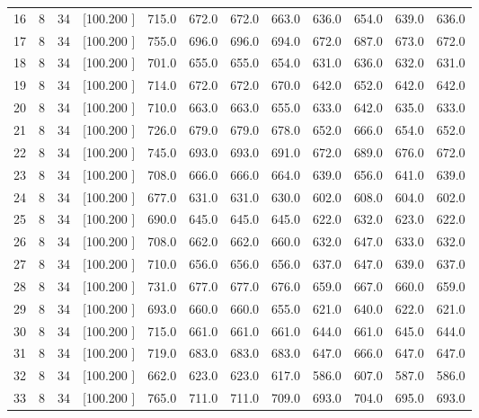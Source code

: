 \documentclass[12pt,a4paper]{article}
\begin{document}
\begin{center}
{\begin{tabular}{r r r r r r r r r r r r}
  16&  8& 34&[100.200   ]&   715.0&   672.0&   672.0&   663.0&   636.0&   654.0&   639.0&   636.0\\[-0.02in]
  17&  8& 34&[100.200   ]&   755.0&   696.0&   696.0&   694.0&   672.0&   687.0&   673.0&   672.0\\[-0.02in]
  18&  8& 34&[100.200   ]&   701.0&   655.0&   655.0&   654.0&   631.0&   636.0&   632.0&   631.0\\[-0.02in]
  19&  8& 34&[100.200   ]&   714.0&   672.0&   672.0&   670.0&   642.0&   652.0&   642.0&   642.0\\[-0.02in]
  20&  8& 34&[100.200   ]&   710.0&   663.0&   663.0&   655.0&   633.0&   642.0&   635.0&   633.0\\[-0.02in]
  21&  8& 34&[100.200   ]&   726.0&   679.0&   679.0&   678.0&   652.0&   666.0&   654.0&   652.0\\[-0.02in]
  22&  8& 34&[100.200   ]&   745.0&   693.0&   693.0&   691.0&   672.0&   689.0&   676.0&   672.0\\[-0.02in]
  23&  8& 34&[100.200   ]&   708.0&   666.0&   666.0&   664.0&   639.0&   656.0&   641.0&   639.0\\[-0.02in]
  24&  8& 34&[100.200   ]&   677.0&   631.0&   631.0&   630.0&   602.0&   608.0&   604.0&   602.0\\[-0.02in]
  25&  8& 34&[100.200   ]&   690.0&   645.0&   645.0&   645.0&   622.0&   632.0&   623.0&   622.0\\[-0.02in]
  26&  8& 34&[100.200   ]&   708.0&   662.0&   662.0&   660.0&   632.0&   647.0&   633.0&   632.0\\[-0.02in]
  27&  8& 34&[100.200   ]&   710.0&   656.0&   656.0&   656.0&   637.0&   647.0&   639.0&   637.0\\[-0.02in]
  28&  8& 34&[100.200   ]&   731.0&   677.0&   677.0&   676.0&   659.0&   667.0&   660.0&   659.0\\[-0.02in]
  29&  8& 34&[100.200   ]&   693.0&   660.0&   660.0&   655.0&   621.0&   640.0&   622.0&   621.0\\[-0.02in]
  30&  8& 34&[100.200   ]&   715.0&   661.0&   661.0&   661.0&   644.0&   661.0&   645.0&   644.0\\[-0.02in]
  31&  8& 34&[100.200   ]&   719.0&   683.0&   683.0&   683.0&   647.0&   666.0&   647.0&   647.0\\[-0.02in]
  32&  8& 34&[100.200   ]&   662.0&   623.0&   623.0&   617.0&   586.0&   607.0&   587.0&   586.0\\[-0.02in]
  33&  8& 34&[100.200   ]&   765.0&   711.0&   711.0&   709.0&   693.0&   704.0&   695.0&   693.0\\[-0.02in]

\end{tabular}}
\end{center}
\end{document}
